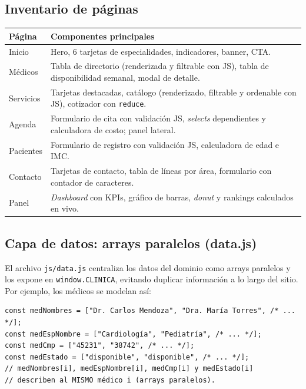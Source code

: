 \documentclass[11pt,a4paper]{article}
\newcommand{\thead}[1]{\textbf{\color{white}#1}}
\newcommand{\hrow}{\rowcolor{navy}}
\begin{document}
\subsection{Inventario de páginas}
\begin{center}
\begin{tabularx}{\textwidth}{l Y}
\hrow \thead{Página} & \thead{Componentes principales} \\
\midrule
Inicio & Hero, 6 tarjetas de especialidades, indicadores, banner, CTA. \\
Médicos & Tabla de directorio (renderizada y filtrable con JS), tabla de disponibilidad semanal, modal de detalle. \\
Servicios & Tarjetas destacadas, catálogo (renderizado, filtrable y ordenable con JS), cotizador con \lstinline|reduce|. \\
Agenda & Formulario de cita con validación JS, \emph{selects} dependientes y calculadora de costo; panel lateral. \\
Pacientes & Formulario de registro con validación JS, calculadora de edad e IMC. \\
Contacto & Tarjetas de contacto, tabla de líneas por área, formulario con contador de caracteres. \\
Panel & \emph{Dashboard} con KPIs, gráfico de barras, \emph{donut} y rankings calculados en vivo. \\
\bottomrule
\end{tabularx}
\end{center}

\subsection{Capa de datos: arrays paralelos (data.js)}
El archivo \texttt{js/data.js} centraliza los datos del dominio como arrays paralelos y los expone en \lstinline|window.CLINICA|, evitando duplicar información a lo largo del sitio. Por ejemplo, los médicos se modelan así:

\begin{lstlisting}
const medNombres = ["Dr. Carlos Mendoza", "Dra. María Torres", /* ... */];
const medEspNombre = ["Cardiología", "Pediatría", /* ... */];
const medCmp = ["45231", "38742", /* ... */];
const medEstado = ["disponible", "disponible", /* ... */];
// medNombres[i], medEspNombre[i], medCmp[i] y medEstado[i]
// describen al MISMO médico i (arrays paralelos).
\end{lstlisting}
\end{document}
